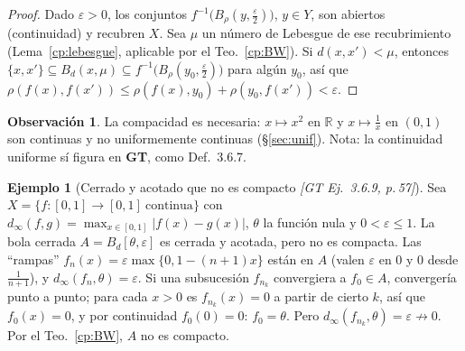 \documentclass[11pt,a4paper]{article}
\newcommand{\figtit}[1]{\par\vspace{2pt}{\footnotesize\itshape #1}\par}
\theoremstyle{definition}
\newtheorem{ejemplo}[definicion]{Ejemplo}
\newtheorem{observacion}[definicion]{Observación}
\theoremstyle{plain}
\newcommand{\fnt}[1]{{\normalfont\small\itshape\color{gray!150!black}[#1]}}
\newcommand{\R}{\mathbb{R}}
\newcommand{\Bola}[2]{B_d(#1,#2)}
\newcommand{\Bolac}[2]{B_d[#1,#2]}
\begin{document}
\begin{proof}
Dado $\varepsilon>0$, los conjuntos $f^{-1}\big(B_\rho(y,\tfrac\varepsilon2)\big)$, $y\in Y$, son abiertos (continuidad) y recubren $X$. Sea $\mu$ un número de Lebesgue de ese recubrimiento (Lema~\ref{cp:lebesgue}, aplicable por el Teo.~\ref{cp:BW}). Si $d(x,x')<\mu$, entonces $\{x,x'\}\subseteq\Bola{x}{\mu}\subseteq f^{-1}\big(B_\rho(y_0,\tfrac\varepsilon2)\big)$ para algún $y_0$, así que $\rho(f(x),f(x'))\le\rho(f(x),y_0)+\rho(y_0,f(x'))<\varepsilon$.
\end{proof}

\begin{observacion}
La compacidad es necesaria: $x\mapsto x^2$ en $\R$ y $x\mapsto\tfrac1x$ en $(0,1)$ son continuas y no uniformemente continuas (\S\ref{sec:unif}). Nota: la continuidad uniforme sí figura en \textbf{GT}, como Def.\ 3.6.7.
\end{observacion}

\begin{ejemplo}[Cerrado y acotado que no es compacto \fnt{GT Ej.\ 3.6.9, p.\,57}]\label{cp:bolafun}
Sea $X=\{f:[0,1]\to[0,1]\ \text{continua}\}$ con $d_\infty(f,g)=\max_{x\in[0,1]}|f(x)-g(x)|$, $\theta$ la función nula y $0<\varepsilon\le1$. La bola cerrada $A=\Bolac{\theta}{\varepsilon}$ es cerrada y acotada, pero no es compacta. Las ``rampas'' $f_n(x)=\varepsilon\max\{0,1-(n+1)x\}$ están en $A$ (valen $\varepsilon$ en $0$ y $0$ desde $\tfrac1{n+1}$), y $d_\infty(f_n,\theta)=\varepsilon$. Si una subsucesión $f_{n_k}$ convergiera a $f_0\in A$, convergería punto a punto; para cada $x>0$ es $f_{n_k}(x)=0$ a partir de cierto $k$, así que $f_0(x)=0$, y por continuidad $f_0(0)=0$: $f_0=\theta$. Pero $d_\infty(f_{n_k},\theta)=\varepsilon\not\to0$. Por el Teo.~\ref{cp:BW}, $A$ no es compacto.
\end{ejemplo}

\begin{figure}[ht]
\centering
{}
\figtit{Figura 35. Las rampas de GT Ej.\ 3.6.9: todas a distancia $\varepsilon$ de $\theta$, con soporte cada vez más angosto. Punto a punto tienden a una función discontinua ($\varepsilon$ en $0$, $0$ en el resto), así que ninguna subsucesión converge uniformemente.}
\end{figure}
\end{document}
